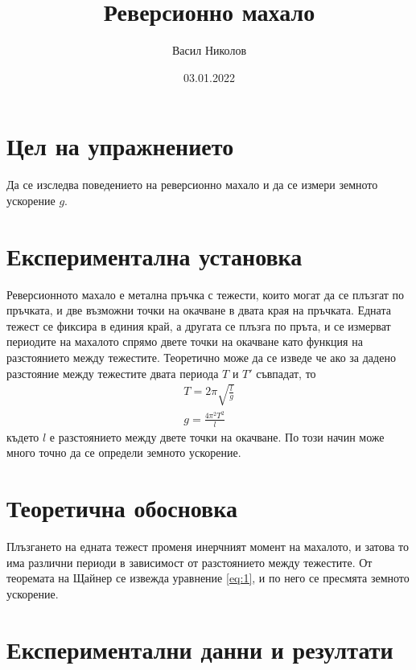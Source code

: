 \documentclass[aps, prb, twocolumn, a4paper, floatfix, reprint]{revtex4-2}
\begin{document}
\title{Реверсионно махало}
\author{Васил Николов}
\noaffiliation
\date{03.01.2022}
\maketitle

\section{Цел на упражнението}
Да се изследва поведението на реверсионно махало и да се измери земното ускорение $g$.

\section{Експериментална установка}
Реверсионното махало е метална пръчка с тежести, които могат да се плъзгат по пръчката, и две възможни точки на окачване в двата края на пръчката. Едната тежест се фиксира в единия край, а другата се плъзга по пръта, и се измерват периодите на махалото спрямо двете точки на окачване като функция на разстоянието между тежестите. Теоретично може да се изведе че ако за дадено разстояние между тежестите двата периода $T$ и $T'$ съвпадат, то
\begin{gather*} 
    T = 2\pi \sqrt{\frac{l}{g}} \\
    g = \frac{4\pi^2 T^2}{l} \label{eq:1} \tag{1}
\end{gather*}
където $l$ е разстоянието между двете точки на окачване. По този начин може много точно да се определи земното ускорение.  

\section{Теоретична обосновка}
Плъзгането на едната тежест променя инерчният момент на махалото, и затова то има различни периоди в зависимост от разстоянието между тежестите. От теоремата на Щайнер се извежда уравнение \eqref{eq:1}, и по него се пресмята земното ускорение. 

\section{Експериментални данни и резултати}
\end{document}
